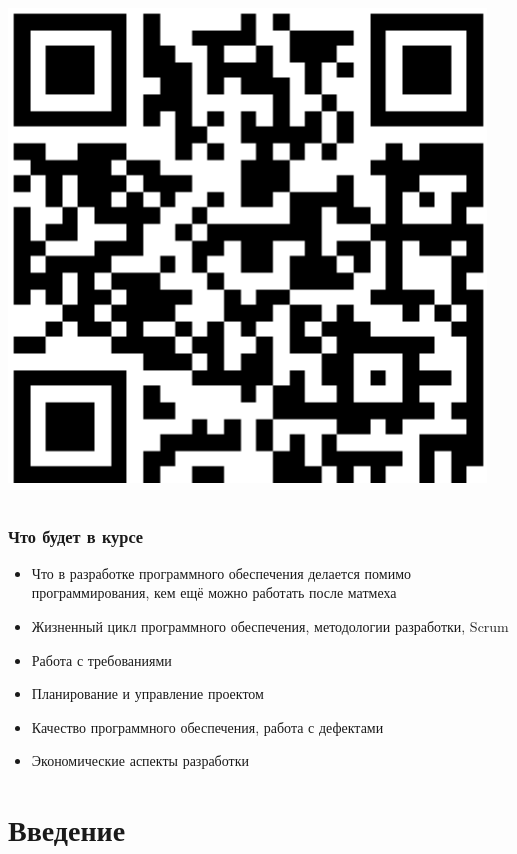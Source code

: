 \documentclass{../../slides-style}
\begin{document}
\begin{frame}
\begin{columns}
\begin{column}{0.3\textwidth}
\begin{center}
                    \includegraphics[width=0.95\textwidth]{courseLink2025.png}
                \end{center}
            \end{column}
        \end{columns}
    \end{frame}

    \begin{frame}
        \frametitle{Что будет в курсе}
        \begin{itemize}
            \item Что в разработке программного обеспечения делается помимо программирования, кем ещё можно работать после матмеха
            \item Жизненный цикл программного обеспечения, методологии разработки, Scrum
            \item Работа с требованиями
            \item Планирование и управление проектом
            \item Качество программного обеспечения, работа с дефектами
            \item Экономические аспекты разработки
        \end{itemize}
    \end{frame}

    \section{Введение}
\end{document}
